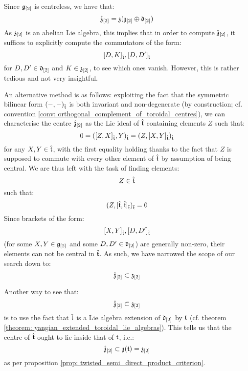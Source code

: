         \begin{remark}
            Since $\mathfrak{g}_{[2]}$ is centreless, we have that:
                $$\hat{\mathfrak{z}}_{[2]} = \mathfrak{z}( \mathfrak{z}_{[2]} \oplus \mathfrak{d}_{[2]} )$$
            As $\mathfrak{z}_{[2]}$ is an abelian Lie algebra, this implies that in order to compute $\hat{\mathfrak{z}}_{[2]}$, it suffices to explicitly compute the commutators of the form:
                $$[D, K]_{\hat{\mathfrak{t}}}, [D, D']_{\hat{\mathfrak{t}}}$$
            for $D, D' \in \mathfrak{d}_{[2]}$ and $K \in \mathfrak{z}_{[2]}$, to see which ones vanish. However, this is rather tedious and not very insightful.
            
            An alternative method is as follows: exploiting the fact that the symmetric bilinear form $(-, -)_{\hat{\mathfrak{t}}}$ is both invariant and non-degenerate (by construction; cf. convention \ref{conv: orthogonal_complement_of_toroidal_centres}), we can characterise the centre $\hat{\mathfrak{z}}_{[2]}$ as the Lie ideal of $\hat{\mathfrak{t}}$ containing elements $Z$ such that:
                $$0 = ([Z, X]_{\hat{\mathfrak{t}}}, Y)_{\hat{\mathfrak{t}}} = (Z, [X, Y]_{\hat{\mathfrak{t}}})_{\hat{\mathfrak{t}}}$$
            for any $X, Y \in \hat{\mathfrak{t}}$, with the first equality holding thanks to the fact that $Z$ is supposed to commute with every other element of $\hat{\mathfrak{t}}$ by assumption of being central. We are thus left with the task of finding elements:
                $$Z \in \hat{\mathfrak{t}}$$
            such that:
                $$(Z, [\hat{\mathfrak{t}}, \hat{\mathfrak{t}}]_{\hat{\mathfrak{t}}})_{\hat{\mathfrak{t}}} = 0$$
            Since brackets of the form:
                $$[X, Y]_{\hat{\mathfrak{t}}}, [D, D']_{\hat{\mathfrak{t}}}$$
            (for some $X, Y \in \mathfrak{g}_{[2]}$ and some $D, D' \in \mathfrak{d}_{[2]}$) are generally non-zero, their elements can not be central in $\hat{\mathfrak{t}}$. As such, we have narrowed the scope of our search down to:
                $$\hat{\mathfrak{z}}_{[2]} \subset \mathfrak{z}_{[2]}$$

            Another way to see that:
                $$\hat{\mathfrak{z}}_{[2]} \subset \mathfrak{z}_{[2]}$$
            is to use the fact that $\hat{\mathfrak{t}}$ is a Lie algebra extension of $\mathfrak{d}_{[2]}$ by $\mathfrak{t}$ (cf. theorem \ref{theorem: yangian_extended_toroidal_lie_algebras}). This tells us that the centre of $\hat{\mathfrak{t}}$ ought to lie inside that of $\mathfrak{t}$, i.e.:
                $$\hat{\mathfrak{z}}_{[2]} \subset \mathfrak{z}(\mathfrak{t}) = \mathfrak{z}_{[2]}$$
            as per proposition \ref{prop: twisted_semi_direct_product_criterion}.
        \end{remark}
